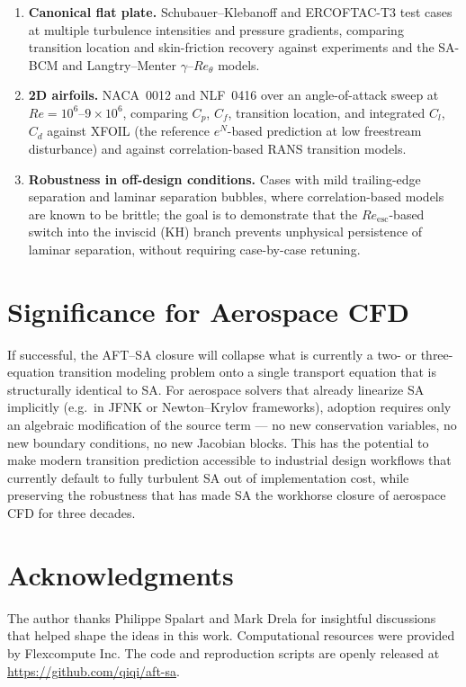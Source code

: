 \documentclass[11pt]{article}
\begin{document}
\begin{enumerate}\setlength{\itemsep}{2pt}
\item \textbf{Canonical flat plate.} Schubauer--Klebanoff and ERCOFTAC-T3
test cases at multiple turbulence intensities and pressure gradients,
comparing transition location and skin-friction recovery against
experiments and the SA-BCM and Langtry--Menter $\gamma$--$Re_\theta$ models.
\item \textbf{2D airfoils.} NACA~0012 and NLF~0416 over an angle-of-attack
sweep at $Re=10^6$--$9\!\times\!10^6$, comparing $C_p$, $C_f$, transition
location, and integrated $C_l$, $C_d$ against XFOIL (the reference
$e^N$-based prediction at low freestream disturbance) and against
correlation-based RANS transition models.
\item \textbf{Robustness in off-design conditions.} Cases with mild
trailing-edge separation and laminar separation bubbles, where
correlation-based models are known to be brittle; the goal is to demonstrate
that the $Re_{\mathrm{esc}}$-based switch into the inviscid (KH) branch
prevents unphysical persistence of laminar separation, without requiring
case-by-case retuning.
\end{enumerate}

\section{Significance for Aerospace CFD}

If successful, the AFT--SA closure will collapse what is currently a
two- or three-equation transition modeling problem onto a single transport
equation that is structurally identical to SA. For aerospace solvers that
already linearize SA implicitly (e.g.\ in JFNK or Newton--Krylov frameworks),
adoption requires only an algebraic modification of the source term --- no
new conservation variables, no new boundary conditions, no new Jacobian
blocks. This has the potential to make modern transition prediction
accessible to industrial design workflows that currently default to fully
turbulent SA out of implementation cost, while preserving the robustness
that has made SA the workhorse closure of aerospace CFD for three decades.

\section*{Acknowledgments}
The author thanks Philippe Spalart and Mark Drela for insightful discussions
that helped shape the ideas in this work. Computational resources were
provided by Flexcompute Inc. The code and reproduction scripts are openly
released at \url{https://github.com/qiqi/aft-sa}.
\end{document}
